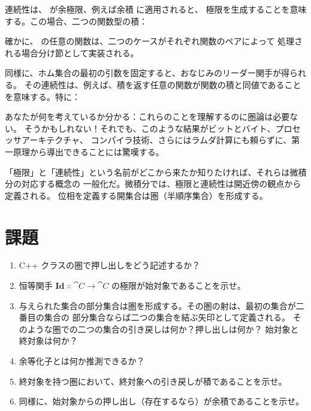 連続性は、 が余極限、例えば余積  に適用されると、
極限を生成することを意味する。この場合、二つの関数型の積：

確かに、 の任意の関数は、二つのケースがそれぞれ関数のペアによって
処理される場合分け節として実装される。

同様に、ホム集合の最初の引数を固定すると、おなじみのリーダー関手が得られる。
その連続性は、例えば、積を返す任意の関数が関数の積と同値であることを意味する。特に：

あなたが何を考えているか分かる：これらのことを理解するのに圏論は必要ない。
そうかもしれない！それでも、このような結果がビットとバイト、プロセッサアーキテクチャ、
コンパイラ技術、さらにはラムダ計算にも頼らずに、第一原理から導出できることには驚嘆する。

「極限」と「連続性」という名前がどこから来たか知りたければ、それらは微積分の対応する概念の
一般化だ。微積分では、極限と連続性は開近傍の観点から定義される。
位相を定義する開集合は圏（半順序集合）を形成する。

\section{課題}

\begin{enumerate}
  \tightlist
  \item
        C++ クラスの圏で押し出しをどう記述するか？
  \item
        恒等関手 $\mathbf{Id} \Colon \cat{C} \to \cat{C}$ の極限が始対象であることを示せ。
  \item
        与えられた集合の部分集合は圏を形成する。その圏の射は、最初の集合が二番目の集合の
        部分集合ならば二つの集合を結ぶ矢印として定義される。
        そのような圏での二つの集合の引き戻しは何か？押し出しは何か？
        始対象と終対象は何か？
  \item
        余等化子とは何か推測できるか？
  \item
        終対象を持つ圏において、終対象への引き戻しが積であることを示せ。
  \item
        同様に、始対象からの押し出し（存在するなら）が余積であることを示せ。
\end{enumerate}
